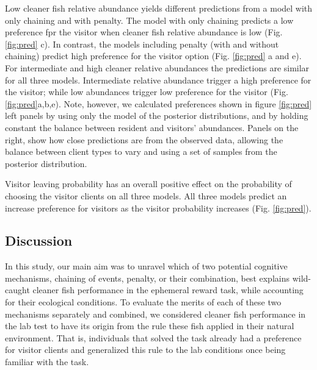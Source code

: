 \documentclass[
  12pt,
]{article}
\begin{document}
Low cleaner fish relative abundance yields different predictions from a
model with only chaining and with penalty. The model with only chaining
predicts a low preference fpr the visitor when cleaner fish relative
abundance is low (Fig. \ref{fig:pred} c). In contrast, the models
including penalty (with and without chaining) predict high preference
for the visitor option (Fig. \ref{fig:pred} a and e). For intermediate
and high cleaner relative abundances the predictions are similar for all
three models. Intermediate relative abundance trigger a high preference
for the visitor; while low abundances trigger low preference for the
visitor (Fig. \ref{fig:pred}a,b,e). Note, however, we calculated
preferences shown in figure \ref{fig:pred} left panels by using only the
model of the posterior distributions, and by holding constant the
balance between resident and visitors' abundances. Panels on the right,
show how close predictions are from the observed data, allowing the
balance between client types to vary and using a set of samples from the
posterior distribution.

Visitor leaving probability has an overall positive effect on the
probability of choosing the visitor clients on all three models. All
three models predict an increase preference for visitors as the visitor
probability increases (Fig. \ref{fig:pred}).

\hypertarget{discussion}{%
\subsection{Discussion}\label{discussion}}

In this study, our main aim was to unravel which of two potential
cognitive mechanisms, chaining of events, penalty, or their combination,
best explains wild-caught cleaner fish performance in the ephemeral
reward task, while accounting for their ecological conditions. To
evaluate the merits of each of these two mechanisms separately and
combined, we considered cleaner fish performance in the lab test to have
its origin from the rule these fish applied in their natural
environment. That is, individuals that solved the task already had a
preference for visitor clients and generalized this rule to the lab
conditions once being familiar with the task.
\end{document}
